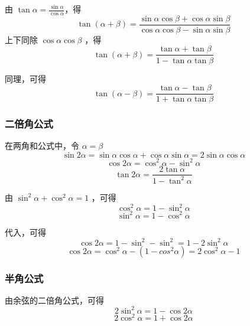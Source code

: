 由 $\tan\alpha = \frac{\sin\alpha}{\cos\alpha}$，得
\begin{equation}
\tan(\alpha+\beta) = \frac{\sin\alpha \cos\beta + \cos\alpha \sin\beta}{\cos\alpha \cos\beta - \sin\alpha \sin\beta}
\end{equation}
上下同除 $\cos\alpha\cos\beta$ ，得
\begin{equation}
\tan(\alpha+\beta) = \frac{\tan\alpha+\tan\beta}{1 - \tan\alpha\tan\beta}
\end{equation}

同理，可得
\begin{equation}
\tan(\alpha-\beta) = \frac{\tan\alpha - \tan\beta}{1 + \tan\alpha\tan\beta}
\end{equation}

\subsubsection{二倍角公式}
在两角和公式中，令 $\alpha = \beta$
\begin{equation}
\sin2\alpha = \sin\alpha \cos\alpha+\cos\alpha \sin\alpha = 2\sin\alpha \cos\alpha
\end{equation}
\begin{equation}
\cos2\alpha = \cos^2\alpha - \sin^2\alpha
\end{equation}
\begin{equation}
\tan2\alpha = \frac{2\tan\alpha}{1 - \tan^2\alpha}
\end{equation}

由 $\sin^2\alpha + \cos^2\alpha = 1$ ，可得
\begin{equation}
\cos^2\alpha = 1 - \sin^2\alpha
\end{equation}
\begin{equation}
\sin^2\alpha = 1 - \cos^2\alpha
\end{equation}

代入，可得
\begin{equation}
\cos2\alpha = 1 - \sin^2 - \sin^2 = 1 - 2\sin^2\alpha
\end{equation}
\begin{equation}
\cos2\alpha = \cos^2\alpha - (1 - cos^2\alpha) = 2\cos^2\alpha - 1
\end{equation}

\subsubsection{半角公式}
由余弦的二倍角公式，可得
\begin{equation}
2\sin^2\alpha = 1 - \cos2\alpha
\end{equation}
\begin{equation}
2\cos^2\alpha = 1 + \cos2\alpha
\end{equation}

